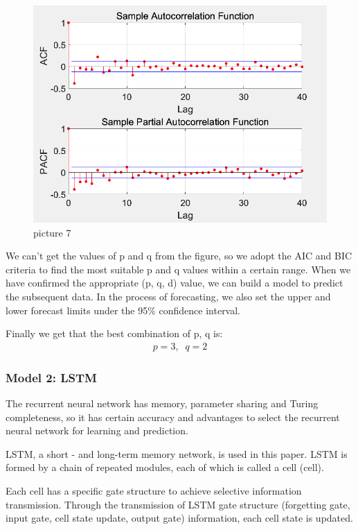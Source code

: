 \documentclass{apmcmthesis}
\begin{document}
\begin{figure}[htbp]
  \centering
  \includegraphics[scale=0.4]{ACF.png}
  \caption{picture 7}\label{fig7}
\end{figure}

We can't get the values of p and q from the figure, so we adopt the AIC and BIC criteria to find the most suitable p and q values within a certain range. When we have confirmed the appropriate (p, q, d) value, we can build a model to predict the subsequent data. In the process of forecasting, we also set the upper and lower forecast limits under the 95\% confidence interval.

Finally we get that the best combination of p, q is:
\begin{align*}
  p=3,\;\;q=2
\end{align*}

\subsubsection{Model 2: LSTM}

The recurrent neural network has memory, parameter sharing and Turing completeness, so it has certain accuracy and advantages to select the recurrent neural network for learning and prediction.

LSTM, a short - and long-term memory network, is used in this paper. LSTM is formed by a chain of repeated modules, each of which is called a cell (cell).

Each cell has a specific gate structure to achieve selective information transmission. Through the transmission of LSTM gate structure (forgetting gate, input gate, cell state update, output gate) information, each cell state is updated.
\end{document}
